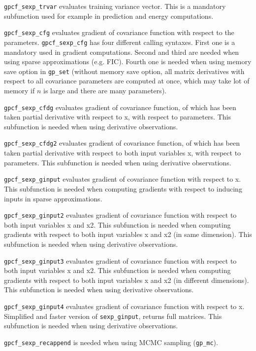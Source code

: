 \documentclass[twoside,11pt]{article}
\newcommand{\code}[1]{{\normalfont\texttt{#1}}}
\begin{document}
\code{gpcf\_sexp\_trvar} evaluates training variance vector. This
is a mandatory subfunction used for example in prediction and
energy computations.

\code{gpcf\_sexp\_cfg} evaluates gradient of covariance function
with respect to the parameters. \code{gpcf\_sexp\_cfg} has four
different calling syntaxes. First one is a mandatory used in
gradient computations. Second and third are needed when using
sparse approximations (e.g. FIC). Fourth one is needed when using
memory save option in \code{gp\_set} (without memory save option, all
matrix derivatives with respect to all covariance parameters are
computed at once, which may take lot of memory if $n$ is large and
there are many parameters).

\code{gpcf\_sexp\_cfdg} evaluates gradient of covariance function,
of which has been taken partial derivative with respect to x, with
respect to parameters. This subfunction is needed when using
derivative observations.

\code{gpcf\_sexp\_cfdg2} evaluates gradient of covariance function,
of which has been taken partial derivative with respect to both
input variables x, with respect to parameters. This subfunction is
needed when using derivative observations.

\code{gpcf\_sexp\_ginput} evaluates gradient of covariance function with
respect to x. This subfunction is needed when computing gradients
with respect to inducing inputs in sparse approximations.

\code{gpcf\_sexp\_ginput2} evaluates gradient of covariance
function with respect to both input variables x and x2. This
subfunction is needed when computing gradients with respect to both
input variables x and x2 (in same dimension). This subfunction is
needed when using derivative observations.

\code{gpcf\_sexp\_ginput3} evaluates gradient of covariance
function with respect to both input variables x and x2. This
subfunction is needed when computing gradients with respect to both
input variables x and x2 (in different dimensions). This
subfunction is needed when using derivative observations.

\code{gpcf\_sexp\_ginput4} evaluates gradient of covariance
function with respect to x. Simplified and faster version of
\code{sexp\_ginput}, returns full matrices. This subfunction is needed when
using derivative observations.

\code{gpcf\_sexp\_recappend} is needed when using MCMC sampling
(\code{gp\_mc}).
\end{document}
